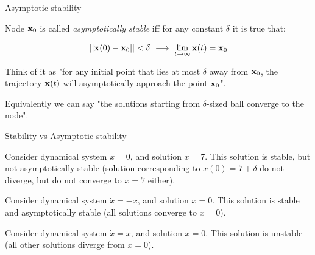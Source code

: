 \documentclass{beamer}
\begin{document}
\begin{frame}{Asymptotic stability}
\begin{flushleft}

Node $\mathbf{x}_0$ is called \emph{asymptotically stable} iff for any constant $\delta$ it is true that:

\begin{equation}
    ||\bo{x}(0) - \bo{x}_0|| < \delta \ \longrightarrow \ 
    \lim_{t\to\infty} \bo{x}(t) = \bo{x}_0
\end{equation}

\bigskip

Think of it as "for any initial point that lies at most $\delta$ away from $\mathbf{x}_0$, the trajectory $\mathbf{x}(t)$ will asymptotically approach the point $\mathbf{x}_0$".

\bigskip

Equivalently we can say "the solutions starting from $\delta$-sized ball converge to the node".

\end{flushleft}
\end{frame}




\begin{frame}{Stability vs Asymptotic stability}
\begin{flushleft}

\begin{example}
Consider dynamical system $\dot{x} = 0$, and solution $x = 7$. This solution is stable, but not asymptotically stable (solution corresponding to $x(0) = 7+\delta$ do not diverge, but do not converge to $x = 7$ either).
\end{example}

\begin{example}
Consider dynamical system $\dot{x} = -x$, and solution $x = 0$. This solution is stable and asymptotically stable (all solutions converge to $x = 0$).
\end{example}

\begin{example}
Consider dynamical system $\dot{x} = x$, and solution $x = 0$. This solution is unstable (all other solutions diverge from $x = 0$).
\end{example}

\end{flushleft}
\end{frame}
\end{document}
